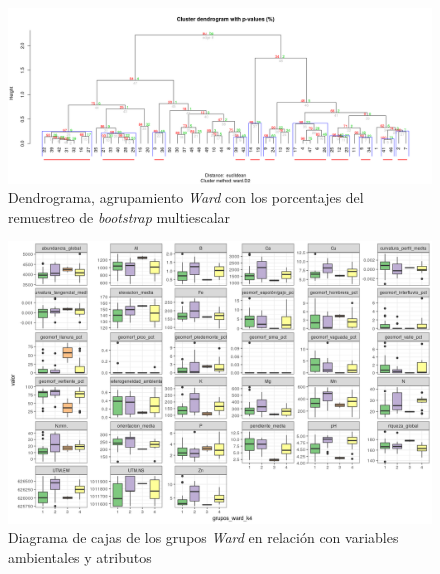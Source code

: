 \documentclass[11pt,]{article}
\begin{document}
\begin{figure}
\centering
\includegraphics{bootstrap_Ward.png}
\caption{Dendrograma, agrupamiento \emph{Ward} con los porcentajes del
remuestreo de \emph{bootstrap} multiescalar
\label{fig:*bootstrap*_multiescalar}}
\end{figure}

\begin{figure}
\centering
\includegraphics{correlograma_wardyvariablesambientales.png}
\caption{Diagrama de cajas de los grupos \emph{Ward} en relación con
variables ambientales y atributos \label{fig:ward_con_variables}}
\end{figure}
\end{document}
